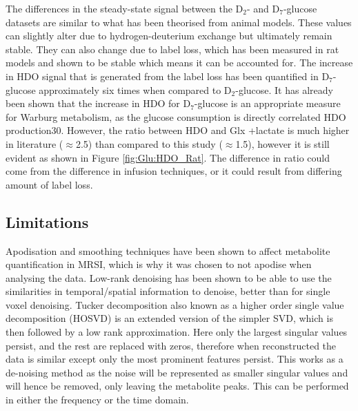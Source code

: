 \documentclass[class=article, crop=false]{standalone}
\begin{document}
The differences in the steady-state signal between the D$_2$- and D$_7$-glucose datasets are similar to what has been theorised from animal models\cite{Mahar2021DeuteratedGlucose}. These values can slightly alter due to hydrogen-deuterium exchange but ultimately remain stable. They can also change due to label loss, which has been measured in rat models and shown to be stable which means it can be accounted for\cite{DeGraaf2021CharacterizationStudies}. The increase in HDO signal that is generated from the label loss has been quantified in D$_7$-glucose approximately six times when compared to D$_2$-glucose. It has already been shown that the increase in HDO for D$_7$-glucose is an appropriate measure for Warburg metabolism, as the glucose consumption is directly correlated HDO production30. However, the ratio between HDO and Glx +lactate is much higher in literature ($\approx$2.5) than compared to this study ($\approx$1.5), however it is still evident as shown in Figure \ref{fig:Glu:HDO_Rat}. The difference in ratio could come from the difference in infusion techniques, or it could result from differing amount of label loss.

\subsection{Limitations}

Apodisation and smoothing techniques have been shown to affect metabolite quantification in MRSI\cite{Goryawala2020EffectsFitting}, which is why it was chosen to not apodise when analysing the data. Low-rank denoising has been shown to be able to use the similarities in temporal/spatial information to denoise, better than for single voxel denoising\cite{Brender2019DynamicHyperpolarization, Goryawala2020EffectsFitting}. Tucker decomposition also known as a higher order single value decomposition (HOSVD) is an extended version of the simpler SVD, which is then followed by a low rank approximation. Here only the largest singular values persist, and the rest are replaced with zeros, therefore when reconstructed the data is similar except only the most prominent features persist. This works as a de-noising method as the noise will be represented as smaller singular values and will hence be removed, only leaving the metabolite peaks. This can be performed in either the frequency or the time domain. 
\end{document}
